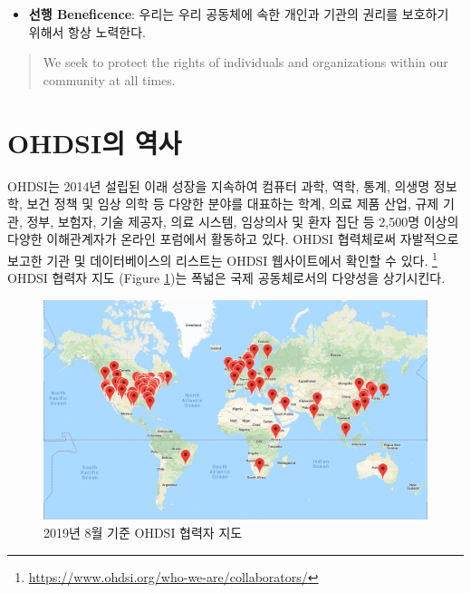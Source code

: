 \documentclass[10.5pt]{book}
\providecommand{\tightlist}{%
  \setlength{\itemsep}{0pt}\setlength{\parskip}{0pt}}
\let\rmarkdownfootnote\footnote%
\def\footnote{\protect\rmarkdownfootnote}
\theoremstyle{definition}
\theoremstyle{definition}
\theoremstyle{definition}
\theoremstyle{remark}
\begin{document}
\begin{itemize}
\tightlist
\item
  \textbf{선행 Beneficence}: 우리는 우리 공동체에 속한 개인과 기관의
  권리를 보호하기 위해서 항상 노력한다.
\end{itemize}

\begin{quote}
We seek to protect the rights of individuals and organizations within
our community at all times.
\end{quote}


\hypertarget{ohdsi-}{\section{OHDSI의 역사}\label{ohdsi-}}

OHDSI는 2014년 설립된 이래 성장을 지속하여 컴퓨터 과학, 역학, 통계,
의생명 정보학, 보건 정책 및 임상 의학 등 다양한 분야를 대표하는 학계,
의료 제품 산업, 규제 기관, 정부, 보험자, 기술 제공자, 의료 시스템,
임상의사 및 환자 집단 등 2,500명 이상의 다양한 이해관계자가 온라인
포럼에서 활동하고 있다. OHDSI 협력체로써 자발적으로 보고한 기관 및
데이터베이스의 리스트는 OHDSI 웹사이트에서 확인할 수 있다. \footnote{\url{https://www.ohdsi.org/who-we-are/collaborators/}}
OHDSI 협력자 지도 (Figure \ref{fig:collaboratormap})는 폭넓은 국제
공동체로서의 다양성을 상기시킨다.

\begin{figure}

{\centering \includegraphics[width=1\linewidth]{images/OhdsiCommunity/mapOfCollaborators} 

}

\caption{2019년 8월 기준 OHDSI 협력자 지도}\label{fig:collaboratormap}
\end{figure}
\end{document}
